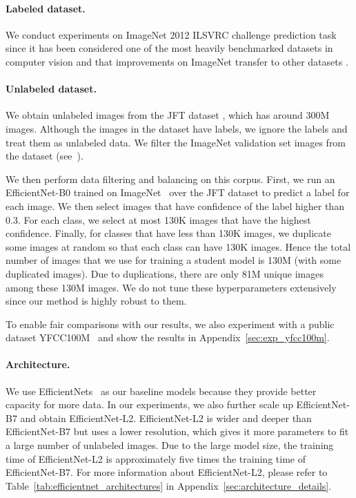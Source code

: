 \documentclass[10pt,twocolumn,letterpaper]{article}
\def\jft{JFT dataset \cite{hinton2015distilling, chollet2017xception}\xspace}
\begin{document}
\paragraph{Labeled dataset.} We conduct experiments on ImageNet 2012 ILSVRC challenge prediction task since it has been considered one of the most heavily benchmarked datasets in computer vision and that improvements on ImageNet transfer to other datasets \cite{kornblith2019better,recht2019imagenet}. 

\paragraph{Unlabeled dataset.} We obtain unlabeled images from the \jft, which has around 300M images. Although the images in the dataset have labels, we ignore the labels and treat them as unlabeled data. We filter the ImageNet validation set images from the dataset (see~\cite{ngiam2018domain}). 

We then perform data filtering and balancing on this corpus. First, we run an EfficientNet-B0 trained on ImageNet~\cite{tan2019efficientnet} over the \jft to predict a label for each image. We then select images that have confidence of the label higher than 0.3.  For each class, we select at most 130K images that have the highest confidence. Finally, for classes that have less than 130K images, we duplicate some images at random so that each class can have 130K images. Hence the total number of images that we use for training a student model is 130M (with some duplicated images). Due to duplications, there are only 81M unique images among these 130M images. We do not tune these hyperparameters extensively since our method is highly robust to them.

To enable fair comparisons with our results, we also experiment with a public dataset YFCC100M~\cite{thomee2016yfcc100m} and show the results in Appendix~\ref{sec:exp_yfcc100m}.

\paragraph{Architecture.} We use EfficientNets~\cite{tan2019efficientnet} as our baseline models because they provide better capacity for more data. In our experiments, we also further scale up EfficientNet-B7 and obtain EfficientNet-L2. EfficientNet-L2 is
wider and deeper than EfficientNet-B7 but uses a lower resolution, which gives it more parameters to fit a large number of unlabeled images. Due to the large model size, the training time of EfficientNet-L2 is approximately five times the training time of EfficientNet-B7.  For more information about EfficientNet-L2, please refer to Table~\ref{tab:efficientnet_architectures} in Appendix~\ref{sec:architecture_details}.
\end{document}
